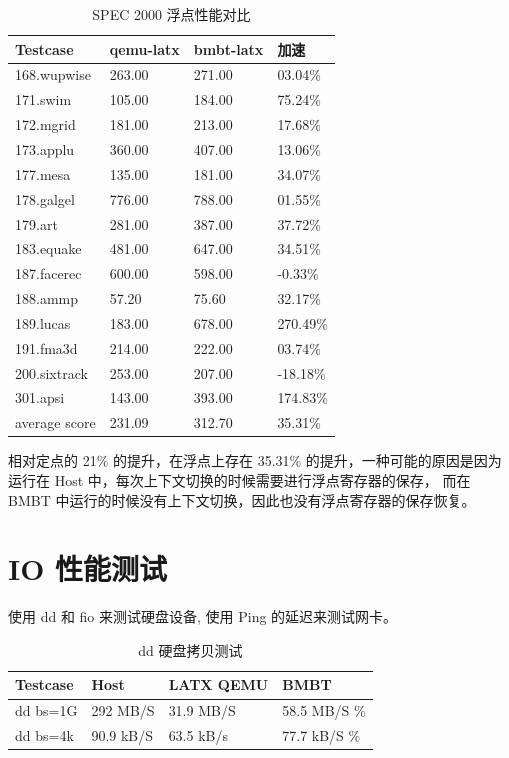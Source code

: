 \begin{table}[!ht]
	\centering
	\caption{SPEC 2000 浮点性能对比}
	\begin{tabular}{|l|l|l|l|}
		\hline
		Testcase      & qemu-latx & bmbt-latx & 加速     \\ \hline
		168.wupwise   & 263.00    & 271.00    & 03.04\%  \\ \hline
		171.swim      & 105.00    & 184.00    & 75.24\%  \\ \hline
		172.mgrid     & 181.00    & 213.00    & 17.68\%  \\ \hline
		173.applu     & 360.00    & 407.00    & 13.06\%  \\ \hline
		177.mesa      & 135.00    & 181.00    & 34.07\%  \\ \hline
		178.galgel    & 776.00    & 788.00    & 01.55\%  \\ \hline
		179.art       & 281.00    & 387.00    & 37.72\%  \\ \hline
		183.equake    & 481.00    & 647.00    & 34.51\%  \\ \hline
		187.facerec   & 600.00    & 598.00    & -0.33\%  \\ \hline
		188.ammp      & 57.20     & 75.60     & 32.17\%  \\ \hline
		189.lucas     & 183.00    & 678.00    & 270.49\% \\ \hline
		191.fma3d     & 214.00    & 222.00    & 03.74\%  \\ \hline
		200.sixtrack  & 253.00    & 207.00    & -18.18\% \\ \hline
		301.apsi      & 143.00    & 393.00    & 174.83\% \\ \hline
		average score & 231.09    & 312.70    & 35.31\%  \\ \hline
	\end{tabular}
	\label{table:spec2000_latx_qemu_fp}
\end{table}
相对定点的 21\% 的提升，在浮点上存在 35.31\% 的提升，一种可能的原因是因为运行在 Host 中，每次上下文切换的时候需要进行浮点寄存器的保存，
而在 BMBT 中运行的时候没有上下文切换，因此也没有浮点寄存器的保存恢复。

\section{IO 性能测试}
使用 dd 和 fio 来测试硬盘设备, 使用 Ping 的延迟来测试网卡。

\begin{table}[!ht]
	\centering
	\caption{dd 硬盘拷贝测试}
	\begin{tabular}{|l|l|l|l|}
		\hline
		Testcase & Host      & LATX QEMU & BMBT         \\ \hline
		dd bs=1G & 292 MB/S  & 31.9 MB/S & 58.5 MB/S \% \\ \hline
		dd bs=4k & 90.9 kB/S & 63.5 kB/s & 77.7 kB/S \% \\ \hline
	\end{tabular}
	\label{fig:dd}
\end{table}

